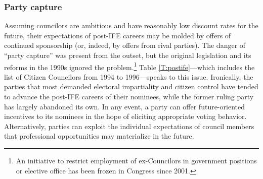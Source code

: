 \documentclass[12 pt, letter]{article}
\begin{document}
\subsubsection{Party capture}
Assuming councilors are ambitious and have reasonably low discount
rates for the future, their expectations of post-IFE careers may be
molded by offers of continued sponsorship (or, indeed, by offers
from rival parties).  The danger of ``party capture'' was present
from the outset, but the original legislation and its reforms in the
1990s ignored the problem.\footnote{An initiative to restrict
employment of ex-Councilors in government positions or elective
office has been frozen in Congress since 2001.}  Table
\ref{T:postife}---which includes the list of Citizen Councilors from
1994 to 1996---speaks to this issue.  Ironically, the parties that
most demanded electoral impartiality and citizen control have tended
to advance the post-IFE careers of their nominees, while the former
ruling party has largely abandoned its own.  In any event, a party
can offer future-oriented incentives to its nominees in the hope of
eliciting appropriate voting behavior.  Alternatively, parties can
exploit the individual expectations of council members that
professional opportunities may materialize in the future.
\end{document}
